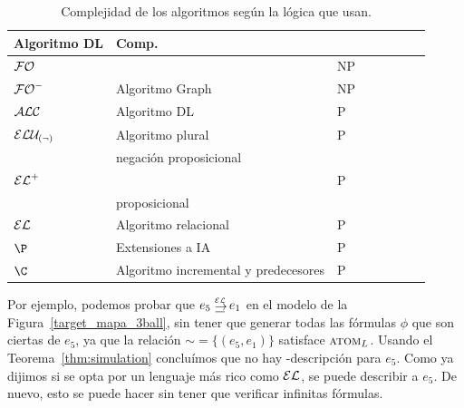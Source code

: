 \begin{table}[t]

\begin{tabular}{|l|l|l|}
\hline
  Algoritmo DL & Comp.\\
  \hline
  $\mathcal{FO}$   &  & NP\\ \hline
  ${\mathcal{FO}^-}$ & Algoritmo Graph \cite{Krahmer:2003} & NP\\ \hline 
  $\mathcal{ALC}$   & Algoritmo DL \cite{arec2:2008:Areces} & P\\ \hline
 
	$\mathcal{ELU_{(\neg)} }$ & Algoritmo plural \cite{gardent02:_gener_minim_defin_descr} &P\\ 
	&negaci\'on proposicional&&&&&&&\\ \hline
  ${\mathcal{EL}^+}$ &  &P\\ 
	&proposicional&&&&&&&\\ \hline
	$\mathcal{EL}$   & Algoritmo relacional &P\\ \hline
	$\P$ &  Extensiones a IA \cite{deemter02:CL}&P\\ 
	$\C$ & Algoritmo incremental y predecesores \cite{incremental} &P\\ 
	
\hline	
\end{tabular}

\caption{Complejidad de los algoritmos seg\'un la l\'ogica que usan.}\label{tab:algoritmos-complejidad}
\end{table}




Por ejemplo, podemos probar que $e_5 \simul{\EL} e_1$ en el modelo de la 
Figura~\ref{target_mapa_3ball}, sin tener que generar todas las f\'ormulas $\phi$ que son ciertas de $e_5$, ya que la relaci\'on ${\sim} = \{(e_5,e_1) \}
$ satisface $\textsc{atom}_L$.
Usando el Teorema~\ref{thm:simulation} conclu\'imos que no hay
 \C-descripci\'on para $e_5$. Como ya dijimos si se opta por un lenguaje m\'as rico como $\mathcal{EL}$, se puede describir a $e_5$. De nuevo, esto se puede hacer sin tener que verificar infinitas f\'ormulas.

